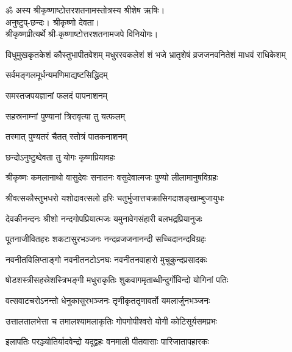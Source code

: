 ॐ अस्य श्रीकृष्णाष्टोत्तरशतनामस्तोत्रस्य श्रीशेष ऋषिः।\\
अनुष्टुप्-छन्दः। श्रीकृष्णो देवता।\\
 श्रीकृष्णप्रीत्यर्थे श्री-कृष्णाष्टोत्तरशतनामजपे विनियोगः।

{विधुमुखकृतकेशं कौस्तुभापीतवेशम्}
{मधुररवकलेशं शं भजे भ्रातृशेषं}
{व्रजजनवनितेशं माधवं राधिकेशम्}


{सर्वमङ्गलमूर्धन्यमणिमाद्यष्टसिद्धिदम्}

{समस्तजपयज्ञानां फलदं पापनाशनम्}

{सहस्रनाम्नां पुण्यानां त्रिरावृत्या तु यत्फलम्}

{तस्मात् पुण्यतरं चैतत् स्तोत्रं पातकनाशनम्}

{छन्दोऽनुष्टुब्देवता तु योगः कृष्णप्रियावहः}

\twolineshloka
{श्रीकृष्णः कमलानाथो वासुदेवः सनातनः}
{वसुदेवात्मजः पुण्यो लीलामानुषविग्रहः}

\twolineshloka
{श्रीवत्सकौस्तुभधरो यशोदावत्सलो हरिः}
{चतुर्भुजात्तचक्रासिगदाशङ्खाम्बुजायुधः}

\twolineshloka
{देवकीनन्दनः श्रीशो नन्दगोपप्रियात्मजः}
{यमुनावेगसंहारी बलभद्रप्रियानुजः}

\twolineshloka
{पूतनाजीवितहरः शकटासुरभञ्जनः}
{नन्दव्रजजनानन्दी सच्चिदानन्दविग्रहः}

\twolineshloka
{नवनीतविलिप्ताङ्गो नवनीतनटोऽनघः}
{नवनीतनवाहारो मुचुकुन्दप्रसादकः}

\twolineshloka
{षोडशस्त्रीसहस्रेशस्त्रिभङ्गी मधुराकृतिः}
{शुकवागमृताब्धीन्दुर्गोविन्दो योगिनां पतिः}

\twolineshloka
{वत्सवाटचरोऽनन्तो धेनुकासुरभञ्जनः}
{तृणीकृततृणावर्तो यमलार्जुनभञ्जनः}

\twolineshloka
{उत्तालतालभेत्ता च तमालश्यामलाकृतिः}
{गोपगोपीश्वरो योगी कोटिसूर्यसमप्रभः}

\twolineshloka
{इलापतिः परञ्ज्योतिर्यादवेन्द्रो यदूद्वहः}
{वनमाली पीतवासाः पारिजातापहारकः}

